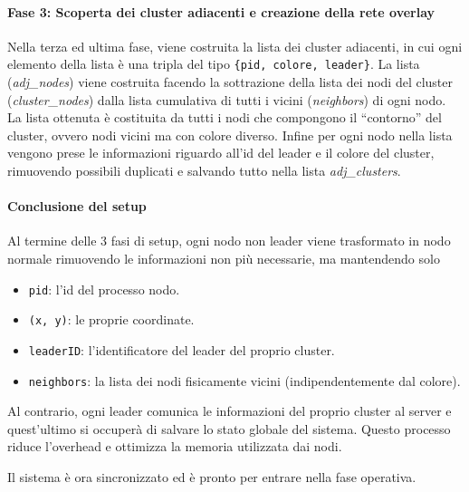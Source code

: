 \documentclass[12pt, a4paper]{report}
\begin{document}
\paragraph{Fase 3: Scoperta dei cluster adiacenti e creazione della rete overlay}
Nella terza ed ultima fase, viene costruita la lista dei cluster adiacenti, in cui ogni elemento della lista \`e una tripla del tipo \texttt{\{pid, colore, leader\}}. La lista (\textit{adj\_nodes}) viene costruita facendo la sottrazione della lista dei nodi del cluster (\textit{cluster\_nodes}) dalla lista cumulativa di tutti i vicini (\textit{neighbors}) di ogni nodo. La lista ottenuta \`e costituita da tutti i nodi che compongono il ``contorno'' del cluster, ovvero nodi vicini ma con colore diverso.
Infine per ogni nodo nella lista vengono prese le informazioni riguardo all'id del leader e il colore del cluster, rimuovendo possibili duplicati e salvando tutto nella lista \textit{adj\_clusters}.

\paragraph{Conclusione del setup}
Al termine delle 3 fasi di setup, ogni nodo non leader viene trasformato in nodo normale rimuovendo le informazioni non pi\`u necessarie, ma mantendendo solo
\begin{itemize}
    \item \texttt{pid}: l'id del processo nodo.
    \item \texttt{(x, y)}: le proprie coordinate.
    \item \texttt{leaderID}: l'identificatore del leader del proprio cluster.
    \item \texttt{neighbors}: la lista dei nodi fisicamente vicini (indipendentemente dal colore).
\end{itemize}
Al contrario, ogni leader comunica le informazioni del proprio cluster al server e quest'ultimo si occuper\`a di salvare lo stato globale del sistema.
Questo processo riduce l'overhead e ottimizza la memoria utilizzata dai nodi.

Il sistema \`e ora sincronizzato ed \`e pronto per entrare nella fase operativa.
\end{document}
